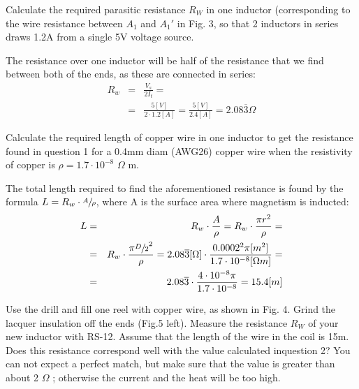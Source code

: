 \documentclass{../../myassignment}
\newcommand{\ohm}{$\Omega$ }
\begin{document}
	\begin{problem}
		Calculate the required parasitic resistance $R_W$ in one inductor (corresponding to the wire resistance between $A_1$ and $A_1'$ in Fig. 3, so that 2 inductors in series draws 1.2A from a single 5V voltage source.

	\end{problem}

	\begin{answer}
		The resistance over one inductor will be half of the resistance that we find between both of the ends, as these are connected in series:
		\begin{eqnarray*}
			R_w &=& \frac{V_s}{2I_t} = \\
			 &=& \frac{5[V]}{2\cdot1.2[A]} = \frac{5[V]}{2.4[A]} = 2.08\overline{3} \Omega
		\end{eqnarray*}

	\end{answer}

	\begin{problem}
		Calculate the required length of copper wire in one inductor to get the resistance found in question 1 for a 0.4mm diam (AWG26) copper wire when the resistivity of copper is $\rho = 1.7\cdot10^{-8}$ \ohm m.
	\end{problem}

	\begin{answer}
		The total length required to find the aforementioned resistance is found by the formula $L=R_w \cdot \sfrac{A}{\rho}$, where A is the surface area where magnetism is inducted:
		\begin{eqnarray*}
			L &=& R_w \cdot \frac{A}{\rho} = R_w \cdot \frac{\pi r^2}{\rho} = \\ 
			&=& R_w \cdot \frac{\pi \sfrac{D}{2}^2}{\rho} = 2.08\overline{3}[\Omega] \cdot \frac{0.0002^2\pi [m^2]}{1.7\cdot10^{-8}[\Omega m]} = \\
			&=& 2.08\overline{3} \cdot \frac{4\cdot10^{-8}\pi}{1.7\cdot10^{-8}} = 15.4 [m]
		\end{eqnarray*}

	\end{answer}

	\newpage
	\begin{problem}
		Use the drill and fill one reel with copper wire, as shown in Fig. 4.  Grind the lacquer insulation off the ends (Fig.5 left).  Measure the resistance $R_W$ of your new inductor with RS-12.  Assume that the length of the wire in the coil is 15m.  Does this resistance correspond well with the value calculated inquestion 2?  You can not expect a perfect match, but make sure that the value is greater than about 2 \ohm; otherwise the current and the heat will be too high.
	\end{problem}
\end{document}
